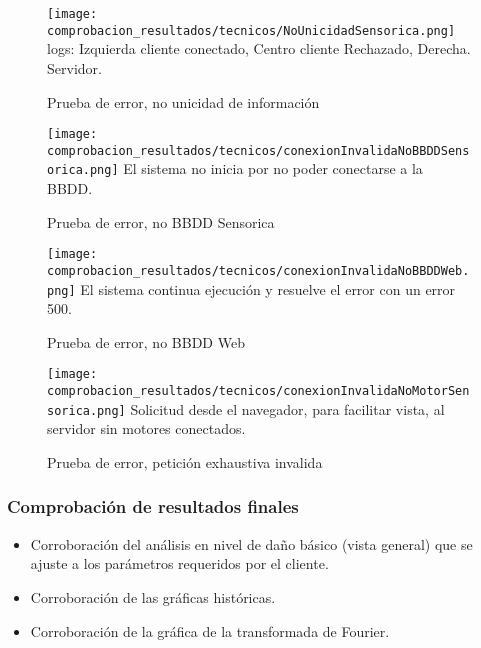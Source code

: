 	\begin{figure}[htb]
		\centering
        \caption{Prueba de error, no unicidad de información}
        \texttt{[image: comprobacion\_resultados/tecnicos/NoUnicidadSensorica.png]}
        logs: Izquierda cliente conectado, Centro cliente Rechazado, Derecha.
        Servidor.
        \label{img:NoUnicidad}
	\end{figure}

    \begin{figure}[htb]
		\centering
        \caption{Prueba de error, no BBDD Sensorica}
        \texttt{[image: comprobacion\_resultados/tecnicos/conexionInvalidaNoBBDDSensorica.png]}
        El sistema no inicia por no poder conectarse a la BBDD.
        \label{img:NoBBDDSensorica}
	\end{figure}

    \begin{figure}[htb]
		\centering
        \caption{Prueba de error, no BBDD Web}
        \texttt{[image: comprobacion\_resultados/tecnicos/conexionInvalidaNoBBDDWeb.png]}
        El sistema continua ejecución y resuelve el error con un error 500.
        \label{img:NoBBDDWeb}
	\end{figure}

    \begin{figure}[htb]
		\centering
        \caption{Prueba de error, petición exhaustiva invalida}
        \texttt{[image: comprobacion\_resultados/tecnicos/conexionInvalidaNoMotorSensorica.png]}
        Solicitud desde el navegador, para facilitar vista, al servidor
        sin motores conectados.
        \label{img:ErrorExhaustiva}
	\end{figure}


\subsubsection{Comprobación de resultados finales}
\begin{itemize}
    \item Corroboración del análisis en nivel de daño básico (vista general)
        que se ajuste a los parámetros requeridos por el cliente.
    \item Corroboración de las gráficas históricas.
    \item Corroboración de la gráfica de la transformada de Fourier.
\end{itemize}


